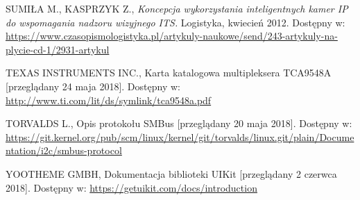 \documentclass[a4paper,11pt,twoside]{article}
\begin{document}
\begin{thebibliography}{9}
SUMIŁA M., KASPRZYK Z., \textit{Koncepcja wykorzystania inteligentnych kamer IP do wspomagania nadzoru wizyjnego ITS.} Logistyka, kwiecień 2012. 
Dostępny w: \url{https://www.czasopismologistyka.pl/artykuly-naukowe/send/243-artykuly-na-plycie-cd-1/2931-artykul}

\uppercase{Texas Instruments Inc.}, Karta katalogowa multipleksera TCA9548A [przeglądany 24 maja 2018].
Dostępny w: \url{http://www.ti.com/lit/ds/symlink/tca9548a.pdf}

\uppercase{Torvalds L.}, Opis protokołu SMBus [przeglądany 20 maja 2018].
Dostępny w: \url{https://git.kernel.org/pub/scm/linux/kernel/git/torvalds/linux.git/plain/Documentation/i2c/smbus-protocol}

\uppercase{YOOTheme GmbH}, Dokumentacja biblioteki UIKit [przeglądany 2 czerwca 2018].
Dostępny w: \url{https://getuikit.com/docs/introduction}

\end{thebibliography}

\newpage
\end{document}
